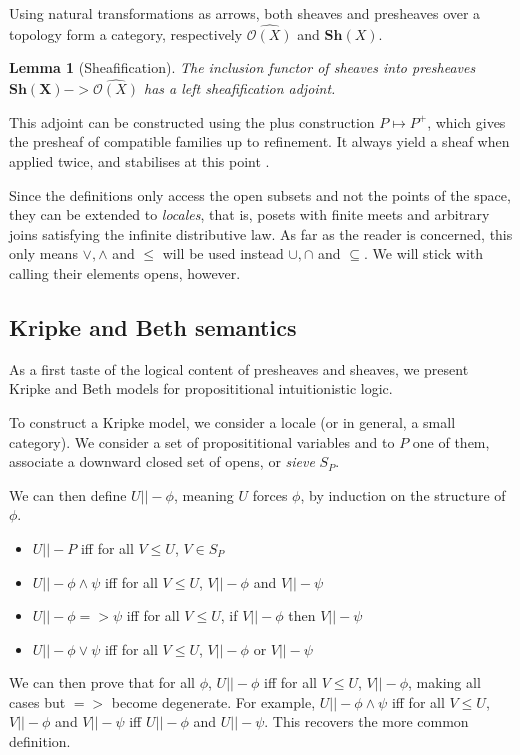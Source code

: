 \documentclass[11pt]{article}
\newtheorem{lemma}[theorem]{Lemma}
\newcommand{\0}{\mathbf{0}}
\newcommand{\1}{\mathbf{1}}
\begin{document}
Using natural transformations as arrows, both sheaves and presheaves over a topology form a category, respectively $\widehat{\mathcal{O}(X)}$ and $\mathbf{Sh}(X)$.
\begin{lemma}[Sheafification]
    The inclusion functor of sheaves into presheaves $\mathbf{Sh(X)} -> \widehat{\mathcal{O}(X)}$ has a left \emph{sheafification} adjoint.
\end{lemma}

This adjoint can be constructed using the plus construction $P \mapsto P^{+}$, which gives the presheaf of compatible families up to refinement.
It always yield a sheaf when applied twice, and stabilises at this point \cite{maclane2012sheaves}.

Since the definitions only access the open subsets and not the points of the space, they can be extended to \emph{locales}, that is, posets with finite meets and arbitrary joins satisfying the infinite distributive law. As far as the reader is concerned, this only means $\vee,\wedge$ and $\leq$ will be used instead $\cup,\cap$ and $\subseteq$. We will stick with calling their elements opens, however.

\subsection{Kripke and Beth semantics}
As a first taste of the logical content of presheaves and sheaves, we present Kripke and Beth models for proposititional intuitionistic logic.


To construct a Kripke model, we consider a locale (or in general, a small category). We consider a set of proposititional variables and to $P$ one of them, associate a downward closed set of opens, or \emph{sieve} $S_P$.

We can then define $U ||- \phi$, meaning $U$ forces $\phi$, by induction on the structure of $\phi$.
\begin{itemize}
    \item $U ||- P$ iff for all $V\leq U$, $V \in S_P$
    \item $U ||- \phi \wedge \psi$ iff for all $V\leq U$, $V ||- \phi$ and $V ||- \psi$
    \item $U ||- \phi => \psi$ iff for all $V \leq U$, if $V ||- \phi$ then $V ||- \psi $
    \item $U ||- \phi \vee \psi $ iff for all $V \leq U$, $V ||- \phi$ or $V ||- \psi$
\end{itemize}
We can then prove that for all $\phi$, $U||-\phi$ iff for all $V \leq U$, $V ||- \phi$, making all cases but $ => $ become degenerate. For example, $U ||- \phi \wedge \psi$ iff for all $V \leq U$, $ V||- \phi$ and $V ||- \psi$ iff $U||- \phi$ and $U||- \psi$. This recovers the more common definition.
\end{document}
